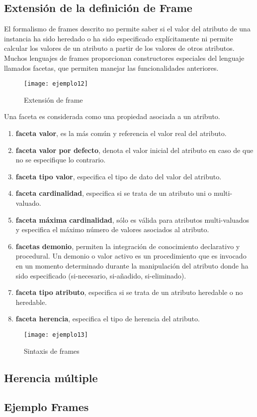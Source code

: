 \documentclass[12pt]{article}
\begin{document}
\subsection{Extensión de la definición de Frame}
El formalismo de frames descrito no permite saber si el valor del atributo de una instancia ha sido heredado o ha sido especificado explícitamente ni permite calcular los valores de un atributo a partir de los valores de otros atributos.\\
Muchos lenguajes de frames proporcionan constructores especiales del lenguaje llamados facetas, que permiten manejar las funcionalidades anteriores.

\begin{figure}[H]
\centering
\texttt{[image: ejemplo12]}
\caption{Extensión de frame}
\label{fig:ejemplo12}
\end{figure}

Una faceta es considerada como una propiedad asociada a un atributo.
\begin{enumerate}
\item \textbf{faceta valor}, es la más común y referencia el valor real del atributo.
\item \textbf{faceta valor por defecto}, denota el valor inicial del atributo en caso de que no se especifique lo contrario.
\item \textbf{faceta tipo valor}, especifica el tipo de dato del valor del atributo.
\item \textbf{faceta cardinalidad}, especifica si se trata de un atributo uni o multi-valuado.
\item \textbf{faceta máxima cardinalidad}, sólo es válida para atributos multi-valuados y especifica el máximo número de valores asociados al atributo.
\item \textbf{facetas demonio}, permiten la integración de conocimiento declarativo y procedural. Un demonio o valor activo es un procedimiento que es invocado en un momento determinado durante la manipulación del atributo donde ha sido especificado (si-necesario, si-añadido, si-eliminado).
\item \textbf{faceta tipo atributo}, especifica si se trata de un atributo heredable o no heredable.
\item  \textbf{faceta herencia}, especifica el tipo de herencia del atributo.
\end{enumerate}

\begin{figure}[H]
\centering
\texttt{[image: ejemplo13]}
\caption{Sintaxis de frames}
\label{fig:ejemplo13}
\end{figure}

\subsection{Herencia múltiple}


\subsection{Ejemplo Frames}
\end{document}

